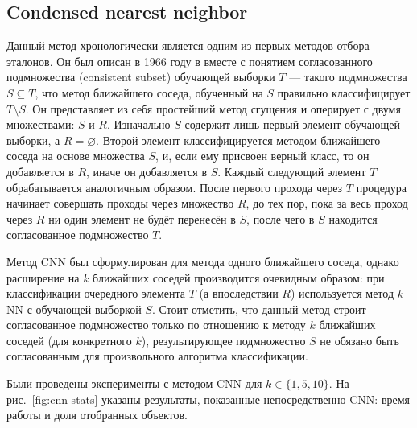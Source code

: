 \subsection{Condensed nearest neighbor}
Данный метод хронологически является одним из первых методов отбора эталонов. Он был описан в 1966 году в \cite{hart} вместе с понятием согласованного подмножества (consistent subset) обучающей выборки \(T\) --- такого подмножества \(S\subseteq T\), что метод ближайшего соседа, обученный на \(S\) правильно классифицирует \(T\setminus S\). Он представляет из себя простейший метод сгущения и оперирует с двумя множествами: \(S\) и \(R\). Изначально \(S\) содержит лишь первый элемент обучающей выборки, а \(R=\varnothing\). Второй элемент классифицируется методом ближайшего соседа на основе множества \(S\), и, если ему присвоен верный класс, то он добавляется в \(R\), иначе он добавляется в \(S\). Каждый следующий элемент \(T\) обрабатывается аналогичным образом. После первого прохода через \(T\) процедура начинает совершать проходы через множество \(R\), до тех пор, пока за весь проход через \(R\) ни один элемент не будёт перенесён в \(S\), после чего в \(S\) находится согласованное подмножество \(T\).

Метод CNN был сформулирован для метода одного ближайшего соседа, однако расширение на \(k\) ближайших соседей производится очевидным образом: при классификации очередного элемента \(T\) (а впоследствии \(R\)) используется метод \(k\)NN с обучающей выборкой \(S\). Стоит отметить, что данный метод строит согласованное подмножество только по отношению к методу \(k\) ближайших соседей (для конкретного \(k\)), результирующее подмножество \(S\) не обязано быть согласованным для произвольного алгоритма классификации.

Были проведены эксперименты с методом CNN для \(k\in\{1, 5, 10\}\). На рис.~\ref{fig:cnn-stats} указаны результаты, показанные непосредственно CNN: время работы и доля отобранных объектов. 


